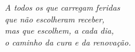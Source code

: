 \thispagestyle{empty}
\vspace*{5cm}

\begin{flushright}
\large\itshape
A todos os que carregam feridas\\
que não escolheram receber,\\
mas que escolhem, a cada dia,\\
o caminho da cura e da renovação.
\end{flushright}

\clearpage
